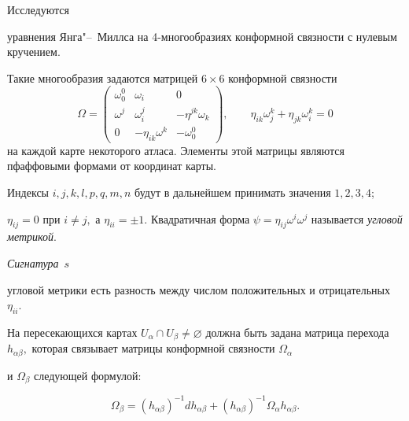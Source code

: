 
Исследуются

уравнения Янга"--~Миллса на 4-многообразиях конформной связности с нулевым кручением. 

Такие многообразия задаются матрицей $6\times 6$ конформной связности\begin{equation}

\Omega =\left( 

\begin{array}{ccc}

\omega _{0}^{0} & \omega _{i} & 0 \\ 

\omega ^{j} & \omega _{i}^{j} & -\eta ^{jk}\omega _{k} \\ 

0 & -\eta _{ik}\omega ^{k} & -\omega _{0}^{0}\end{array}\right) ,\qquad \eta _{ik}\omega _{j}^{k}+\eta _{jk}\omega _{i}^{k}=0

\label{kriv:1}

\end{equation}на каждой карте некоторого атласа. Элементы этой матрицы являются пфаффовыми формами от координат карты. 

Индексы $i, j, k,l,p,q,m,n$ будут в дальнейшем принимать значения $1,2,3,4$; 

$\eta _{ij}=0$ при $i\neq j,$ а $\eta _{ii}=\pm 1.$ Квадратичная форма $\psi =\eta _{ij}\omega ^{i}\omega ^{j}$ называется \textit{угловой метрикой}. 

\textit{Сигнатура}~$s$ 

угловой метрики есть разность между числом положительных и отрицательных $\eta _{ii}.$ 

На пересекающихся картах $U_{\alpha }\cap U_{\beta }\neq \varnothing $ должна быть задана матрица перехода $h_{\alpha \beta },$ которая связывает матрицы конформной связности $\Omega _{\alpha }$ 

и $\Omega _{\beta }$ следующей формулой:

\begin{equation}

\Omega _{\beta }=\left( h_{\alpha \beta }\right) ^{-1}dh_{\alpha \beta

}+\left( h_{\alpha \beta }\right) ^{-1}\Omega _{\alpha }h_{\alpha \beta }.

\label{kriv:2}

\end{equation}



